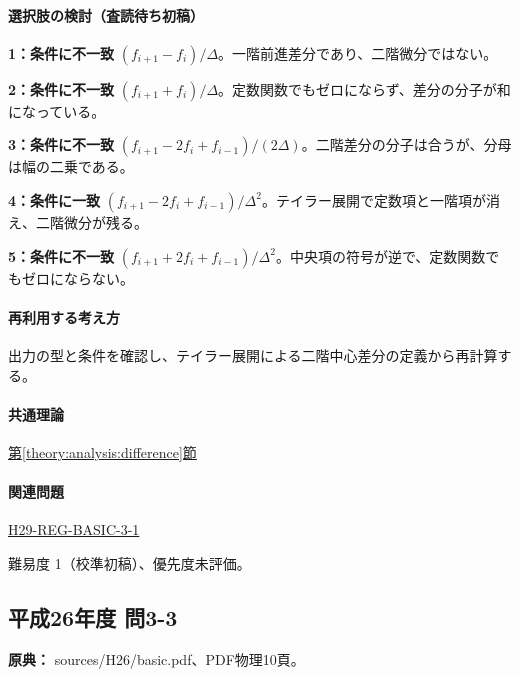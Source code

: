 \paragraph{選択肢の検討（査読待ち初稿）}\mbox{}\par

\noindent\textbf{1：条件に不一致} \((f_{i+1}-f_i)/\Delta\)。一階前進差分であり、二階微分ではない。\par

\noindent\textbf{2：条件に不一致} \((f_{i+1}+f_i)/\Delta\)。定数関数でもゼロにならず、差分の分子が和になっている。\par

\noindent\textbf{3：条件に不一致} \((f_{i+1}-2f_i+f_{i-1})/(2\Delta)\)。二階差分の分子は合うが、分母は幅の二乗である。\par

\noindent\textbf{4：条件に一致} \((f_{i+1}-2f_i+f_{i-1})/\Delta^2\)。テイラー展開で定数項と一階項が消え、二階微分が残る。\par

\noindent\textbf{5：条件に不一致} \((f_{i+1}+2f_i+f_{i-1})/\Delta^2\)。中央項の符号が逆で、定数関数でもゼロにならない。\par

\paragraph{再利用する考え方} 出力の型と条件を確認し、テイラー展開による二階中心差分の定義から再計算する。

\paragraph{共通理論} \hyperref[theory:analysis:difference]{第\ref*{theory:analysis:difference}節}

\paragraph{関連問題} \hyperref[q:h29-reg-basic-3-1]{H29-REG-BASIC-3-1}

\par 難易度 1（校準初稿）、優先度未評価。

\subsection{平成26年度 問3-3}
\label{q:h26-reg-basic-3-3}

\noindent\textbf{原典：} sources/H26/basic.pdf、PDF物理10頁。

